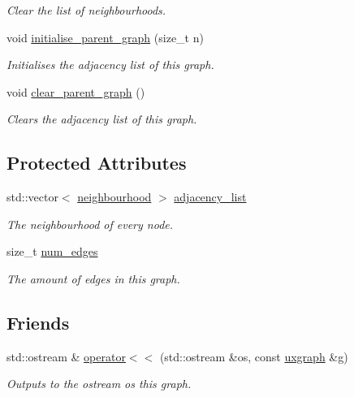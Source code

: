 \begin{DoxyCompactItemize}
\begin{DoxyCompactList}\small\item\em Clear the list of neighbourhoods. \end{DoxyCompactList}\item 
void \hyperlink{classlgraph_1_1xxgraph_a50c658dd39e6b1d38bf7e514daa2f33c}{initialise\-\_\-parent\-\_\-graph} (size\-\_\-t n)
\begin{DoxyCompactList}\small\item\em Initialises the adjacency list of this graph. \end{DoxyCompactList}\item 
void \hyperlink{classlgraph_1_1xxgraph_a4122495066e4402cbf6d2d9bb82d54cc}{clear\-\_\-parent\-\_\-graph} ()
\begin{DoxyCompactList}\small\item\em Clears the adjacency list of this graph. \end{DoxyCompactList}\end{DoxyCompactItemize}
\subsection*{Protected Attributes}
\begin{DoxyCompactItemize}
\item 
\hypertarget{classlgraph_1_1xxgraph_a31cf82d0b20be05290be259dc97a51ec}{std\-::vector$<$ \hyperlink{namespacelgraph_a052e7766c13f3a43cec0aec8173fdede}{neighbourhood} $>$ \hyperlink{classlgraph_1_1xxgraph_a31cf82d0b20be05290be259dc97a51ec}{adjacency\-\_\-list}}\label{classlgraph_1_1xxgraph_a31cf82d0b20be05290be259dc97a51ec}

\begin{DoxyCompactList}\small\item\em The neighbourhood of every node. \end{DoxyCompactList}\item 
\hypertarget{classlgraph_1_1xxgraph_a6765a9a3be42f6e0f824635c593b35d7}{size\-\_\-t \hyperlink{classlgraph_1_1xxgraph_a6765a9a3be42f6e0f824635c593b35d7}{num\-\_\-edges}}\label{classlgraph_1_1xxgraph_a6765a9a3be42f6e0f824635c593b35d7}

\begin{DoxyCompactList}\small\item\em The amount of edges in this graph. \end{DoxyCompactList}\end{DoxyCompactItemize}
\subsection*{Friends}
\begin{DoxyCompactItemize}
\item 
std\-::ostream \& \hyperlink{classlgraph_1_1uxgraph_a74a84e077ff7034900deea3a89653d6c}{operator$<$$<$} (std\-::ostream \&os, const \hyperlink{classlgraph_1_1uxgraph}{uxgraph} \&g)
\begin{DoxyCompactList}\small\item\em Outputs to the ostream {\itshape os} this graph. \end{DoxyCompactList}\end{DoxyCompactItemize}


